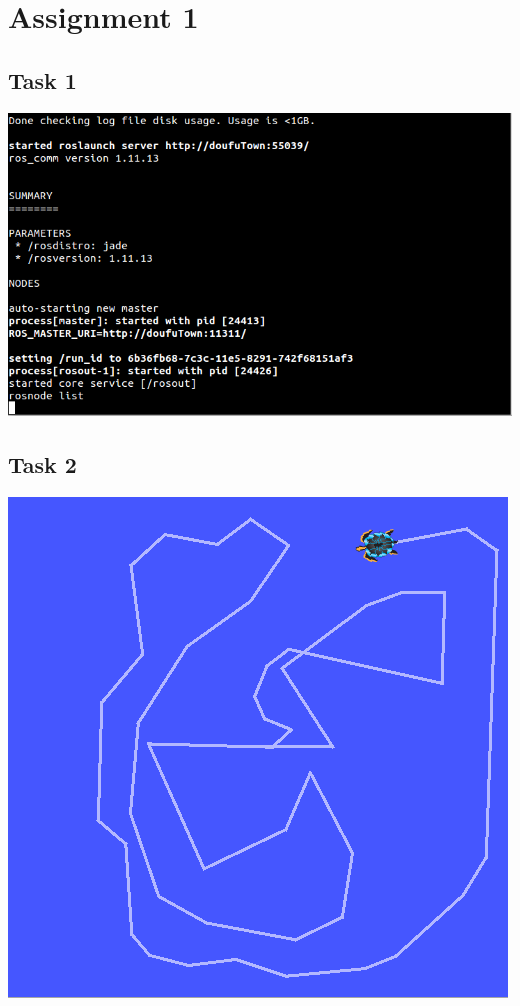 \chapter{Assignment 1}\label{ass1}

\section{Task 1}\label{ass1_t1}

\includegraphics{img/screen_ue1_t1.png}

\section{Task 2}\label{ass1_t2}

\includegraphics{img/screen_ue1_t2.png}